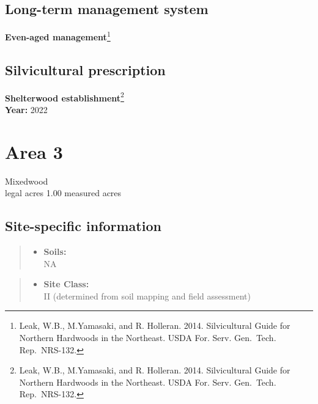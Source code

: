 \documentclass[]{tufte-handout}
\providecommand{\tightlist}{%
  \setlength{\itemsep}{0pt}\setlength{\parskip}{0pt}}
\begin{document}
\subsection{Long-term management
system}\label{long-term-management-system-1}

\textbf{Even-aged management}\footnote{Leak, W.B., M.Yamasaki, and R.
  Holleran. 2014. Silvicultural Guide for Northern Hardwoods in the
  Northeast. USDA For. Serv. Gen.~Tech. Rep.~NRS-132.}

\subsection{Silvicultural
prescription}\label{silvicultural-prescription-1}

\textbf{Shelterwood establishment}\footnote{Leak, W.B., M.Yamasaki, and
  R. Holleran. 2014. Silvicultural Guide for Northern Hardwoods in the
  Northeast. USDA For. Serv. Gen.~Tech. Rep.~NRS-132.}\\
\textbf{Year:} 2022

\newpage

\section{Area 3}\label{area-3}

Mixedwood\\
 legal acres \textbar{} 1.00 measured acres

\subsection{Site-specific
information}\label{site-specific-information-2}

\begin{quote}
\begin{itemize}
\tightlist
\item
  \textbf{Soils:}\\
  \indent\indent  NA
\end{itemize}
\end{quote}

\begin{quote}
\begin{itemize}
\tightlist
\item
  \textbf{Site Class:}\\
  \vspace{2pt} II (determined from soil mapping and field assessment)
\end{itemize}
\end{quote}
\end{document}
